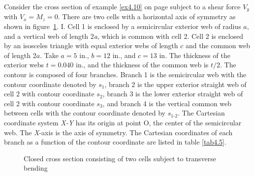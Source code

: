 \documentclass{AeroStructure-ERJohnson}
\begin{document}
\begin{example}\label{ex4.12}\setcounter{equation}{0}\def\theequation{\alph{equation}}Consider the cross section of example \ref{ex4.10} on page \pageref{ex4.10} subject to a shear force ${V}_y$ with $V_{x}=M_{z}=0$. There are two cells with a horizontal axis of symmetry as shown in figure~\ref{fig4.39}. I. Cell 1 is enclosed by a semicircular exterior web of radius $a$, and a vertical web of length 2\textit{a}, which is common with cell 2. Cell 2 is enclosed by an isosceles triangle with equal exterior webs of length $c$ and the common web of length 2$a$. Take $a = 5$ in., $b = 12$ in., and $c = 13$ in. The thickness of the exterior webs $t = 0.040$ in., and the thickness of the common web is $t/2$. The contour is composed of four branches. Branch 1 is the semicircular web with the contour coordinate denoted by $s_1$, branch 2 is the upper exterior straight web of cell 2 with contour coordinate $s_2$, branch 3 is the lower exterior straight web of cell 2 with contour coordinate $s_3$, and branch 4 is the vertical common web between cells with the contour coordinate denoted by $s_{\textrm{1-2}}$. The Cartesian coordinate system \textit{X-Y} has its origin at point O, the center of the semicircular web. The \textit{X}-axis is the axis of symmetry. The Cartesian coordinates of each branch as a function of the contour coordinate are listed in table \ref{tab4.5}.

{\def\thefigure{4.39}
\begin{figure}[H]
\caption{Closed cross section consisting of two cells subject to transverse bending\label{fig4.39}}
\end{figure}
}



\end{example}
\end{document}
